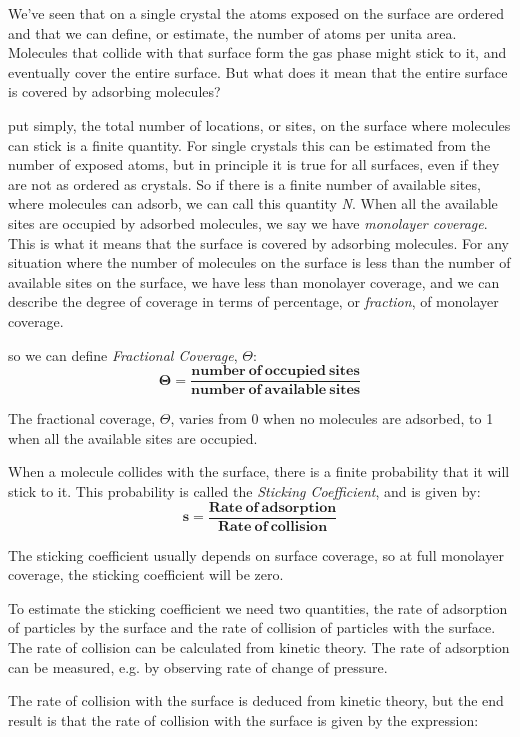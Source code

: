 \documentclass[ignorenonframetext]{beamer}
\begin{document}
We've seen that on a single crystal the atoms exposed on the surface are ordered and that we can define, or estimate, the number of atoms per unita area. Molecules that collide with that surface form the gas phase might stick to it, and eventually cover the entire surface. But what does it mean that the entire surface is covered by adsorbing molecules? 

\medskip put simply, the total number of locations, or sites, on the surface where molecules can stick is a finite quantity. For single crystals this can be estimated from the number of exposed atoms, but in principle it is true for all surfaces, even if they are not as ordered as crystals. So if there is a finite number of available sites, where molecules can adsorb, we can call this quantity \textit{N}. When all the available sites are occupied by adsorbed molecules, we say we have \textit{monolayer coverage}. This is what it means that the surface is covered by adsorbing molecules. For any situation where the number of molecules on the surface is less than the number of available sites on the surface, we have less than monolayer coverage, and we can describe the degree of coverage in terms of percentage, or \textit{fraction}, of monolayer coverage.

so we can define \textit{Fractional Coverage}, \(\Theta\):
\[\mathbf{\Theta = \frac{number\ of\ occupied\ sites}{number\ of\ available\ sites}}\]

The fractional coverage, \(\Theta\), varies from 0 when no molecules are adsorbed, to 1 when all the available sites are occupied.

\medskip When a molecule collides with the surface, there is a finite probability that it will stick to it. This probability is called the \textit{Sticking Coefficient}, and is given by:
\[\mathbf{s = \frac{Rate\ of\ adsorption}{Rate\ of\ collision}}\]

The sticking coefficient usually depends on surface coverage, so at full monolayer coverage, the sticking coefficient will be zero.

To estimate the sticking coefficient we need two quantities, the rate of adsorption of particles by the surface and the rate of collision of particles with the surface. The rate of collision can be calculated from kinetic theory. The rate of adsorption can be measured, e.g. by observing rate of change of pressure.

\medskip The rate of collision with the surface is deduced from kinetic theory, but the end result is that the rate of collision with the surface is given by the expression:
\end{document}
